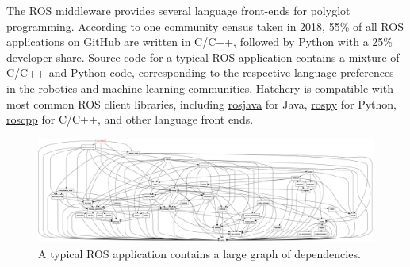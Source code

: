 The ROS middleware provides several language front-ends for polyglot programming. According to one community census taken in 2018, 55\% of all ROS applications on GitHub are written in C/C++, followed by Python with a 25\%~\citep{guenther2018serious} developer share. Source code for a typical ROS application contains a mixture of C/C++ and Python code, corresponding to the respective language preferences in the robotics and machine learning communities. Hatchery is compatible with most common ROS client libraries, including \href{https://wiki.ros.org/rosjava}{rosjava} for Java, \href{https://wiki.ros.org/rospy}{rospy} for Python, \href{https://wiki.ros.org/rospy}{roscpp} for C/C++, and other language front ends.

\begin{figure}
    \centering
    \includegraphics[width=\textwidth]{../figures/rqt_dep_graph.png}
    \caption{A typical ROS application contains a large graph of dependencies.}
\end{figure}

